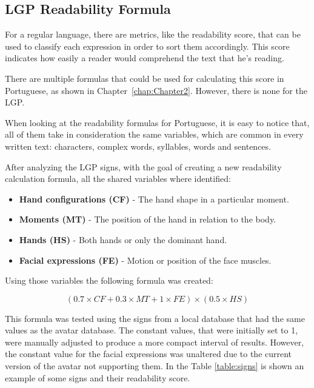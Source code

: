 \subsection{LGP Readability Formula}

For a regular language, there are metrics, like the readability score, that can be used to classify each expression in order to sort them accordingly.
This score indicates how easily a reader would comprehend the text that he's reading.

There are multiple formulas that could be used for calculating this score in Portuguese, as shown in Chapter~\ref{chap:Chapter2}.
However, there is none for the \gls{LGP}.

When looking at the readability formulas for Portuguese, it is easy to notice that, all of them take in consideration the same variables, which are common in every written text: characters, complex words, syllables, words and sentences.

After analyzing the \gls{LGP} signs, with the goal of creating a new readability calculation formula, all the shared variables where identified:

\begin{itemize}
    \item \textbf{Hand configurations (CF)} - The hand shape in a particular moment.
    \item \textbf{Moments (MT)} - The position of the hand in relation to the body.
    \item \textbf{Hands (HS)} - Both hands or only the dominant hand.
    \item \textbf{Facial expressions (FE)} - Motion or position of the face muscles.
\end{itemize}

Using those variables the following formula was created:

\begin{equation}
(0.7 \times CF + 0.3 \times MT + 1 \times FE) \times (0.5 \times HS)
\label{wordScore}
\end{equation}

This formula was tested using the signs from a local database that had the same values as the avatar database.
The constant values, that were initially set to 1, were manually adjusted to produce a more compact interval of results.
However, the constant value for the facial expressions was unaltered due to the current version of the avatar not supporting them.
In the Table \ref{table:signs} is shown an example of some signs and their readability score.

